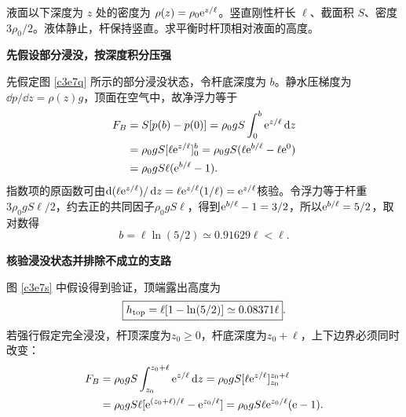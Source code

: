 \begin{question}
\begin{example}[指数密度液体中的浮杆]
液面以下深度为 $z$ 处的密度为 $\rho(z)=\rho_0\mathrm e^{z/\ell}$。竖直刚性杆长 $\ell$、截面积 $S$、密度 $3\rho_0/2$。液体静止，杆保持竖直。求平衡时杆顶相对液面的高度。
\end{example}
\end{question}
\begin{solution}\textbf{先假设部分浸没，按深度积分压强}\par\nobreak
先假定图 \ref{c3e7q} 所示的部分浸没状态，令杆底深度为 $b$。静水压梯度为 $\dd p/\dd z=\rho(z)g$，顶面在空气中，故净浮力等于
\[
 \begin{aligned}
 F_B&=S[p(b)-p(0)]
=\rho_0gS\int_0^b\mathrm e^{z/\ell}\mathop{}\!\mathrm d z\\
&=\rho_0gS[\ell\mathrm e^{z/\ell}]_0^b
=\rho_0gS(\ell\mathrm e^{b/\ell}-\ell\mathrm e^0)\\
&=\rho_0gS\ell(\mathrm e^{b/\ell}-1).
 \end{aligned}
\]
指数项的原函数可由$\mathop{}\!\mathrm d(\ell\mathrm e^{z/\ell})/\mathop{}\!\mathrm d z=\ell\mathrm e^{z/\ell}(1/\ell)=\mathrm e^{z/\ell}$核验。令浮力等于杆重$3\rho_0gS\ell/2$，约去正的共同因子$\rho_0gS\ell$，得到$\mathrm e^{b/\ell}-1=3/2$，所以$\mathrm e^{b/\ell}=5/2$，取对数得
\[
 b=\ell\ln(5/2)\simeq0.91629\ell<\ell.
\]



\par\medskip{}\noindent\textbf{核验浸没状态并排除不成立的支路}\par\nobreak
图 \ref{c3e7s} 中假设得到验证，顶端露出高度为
\[
 \boxed{h_{\rm top}=\ell[1-\ln(5/2)]\simeq0.08371\ell}.
\]
若强行假定完全浸没，杆顶深度为$z_0\ge0$，杆底深度为$z_0+\ell$，上下边界必须同时改变：
\begin{align*}
F_B&=\rho_0gS\int_{z_0}^{z_0+\ell}\mathrm e^{z/\ell}\mathop{}\!\mathrm d z
=\rho_0gS[\ell\mathrm e^{z/\ell}]_{z_0}^{z_0+\ell}\\
&=\rho_0gS\ell
 [\mathrm e^{(z_0+\ell)/\ell}-\mathrm e^{z_0/\ell}]
=\rho_0gS\ell\mathrm e^{z_0/\ell}(\mathrm e-1).
\end{align*}


\end{solution}
